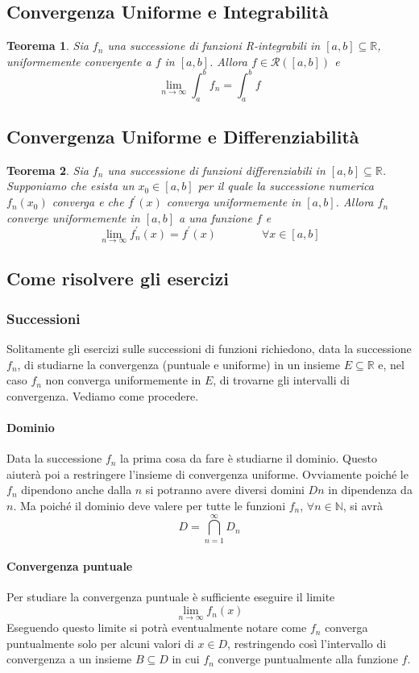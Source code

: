 \documentclass[a4paper,12pt]{article}
\newcommand{\Rint}{\mathcal{R}}
\newtheorem{teo}{Teorema}
\begin{document}
\subsection{Convergenza Uniforme e Integrabilità}
\begin{teo}
Sia ${f_n}$ una successione di funzioni R-integrabili in $[a,b]\subseteq \mathbb{R}$, uniformemente convergente a $f$ in $[a,b]$. Allora $f\in \Rint([a,b])$ e
$$\lim_{n\to\infty}\int_{a}^{b} f_n=\int_{a}^{b}f$$
\end{teo}
\subsection{Convergenza Uniforme e Differenziabilità}
\begin{teo}
Sia $f_n$ una successione di funzioni differenziabili in  $[a,b]\subseteq \mathbb{R}$. Supponiamo che esista un $x_{0} \in [a,b] $ per il quale la successione numerica ${f_n(x_0)}$ converga e che ${f^{'}(x)}$ converga uniformemente in $[a,b]$. Allora ${f_n}$ converge uniformemente in $[a,b]$ a una funzione $f$ e
$$\lim_{n\to\infty} f^{'}_n (x)=f^{'}(x) \qquad \qquad \forall x \in [a,b]$$
\end{teo}

\subsection{Come risolvere gli esercizi}

\subsubsection{Successioni}
Solitamente gli esercizi sulle successioni di funzioni richiedono, data la successione ${f_n}$, di studiarne la convergenza (puntuale e uniforme) in un insieme $E\subseteq \mathbb{R}$ e, nel caso $f_n$ non converga uniformemente in $E$, di trovarne gli intervalli di convergenza. Vediamo come procedere.
\paragraph*{Dominio}
Data la successione ${f_n}$ la prima cosa da fare è studiarne il dominio. Questo aiuterà poi a restringere l'insieme di convergenza uniforme. Ovviamente poiché le $f_n$ dipendono anche dalla $n$ si potranno avere diversi domini $Dn$ in dipendenza da $n$. Ma poiché il dominio deve valere per tutte le funzioni $f_n$, $\forall n\in\mathbb{N}$, si avrà
$$D=\displaystyle\bigcap_{n=1}^{\infty} D_n$$
\paragraph*{Convergenza puntuale}
Per studiare la convergenza puntuale è sufficiente eseguire il limite
$$\lim_{n\to\infty} f_n(x)$$
Eseguendo questo limite si potrà eventualmente notare come ${f_n}$ converga puntualmente solo per alcuni valori di $x\in D$, restringendo così l'intervallo di convergenza a un insieme $B\subseteq D$ in cui $f_n$ converge puntualmente alla funzione $f$.
\end{document}
